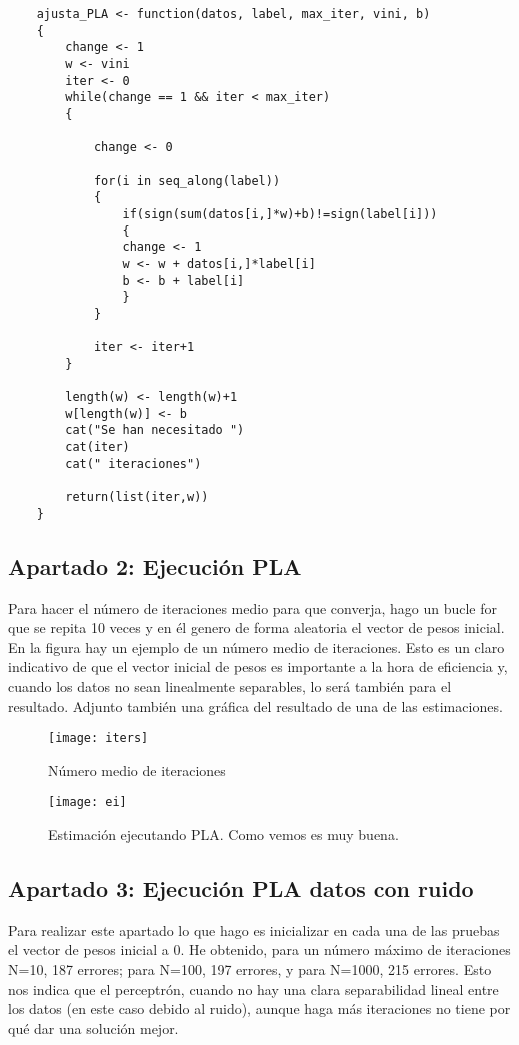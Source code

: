 	\begin{lstlisting}
	ajusta_PLA <- function(datos, label, max_iter, vini, b)
	{
		change <- 1
		w <- vini
		iter <- 0
		while(change == 1 && iter < max_iter)
		{  
		
			change <- 0
			
			for(i in seq_along(label))
			{
				if(sign(sum(datos[i,]*w)+b)!=sign(label[i]))
				{
				change <- 1
				w <- w + datos[i,]*label[i]
				b <- b + label[i]
				}
			}
			
			iter <- iter+1
		}
		
		length(w) <- length(w)+1
		w[length(w)] <- b
		cat("Se han necesitado ")
		cat(iter)
		cat(" iteraciones")
		
		return(list(iter,w))
	}
\end{lstlisting}


\subsection{Apartado 2: Ejecución PLA}
Para hacer el número de iteraciones medio para que converja, hago un bucle for que se repita 10 veces y en él genero de forma aleatoria el vector de pesos inicial. En la figura hay un ejemplo de un número medio de iteraciones. Esto es un claro indicativo de que el vector inicial de pesos es importante a la hora de eficiencia y, cuando los datos no sean linealmente separables, lo será también para el resultado. Adjunto también una gráfica del resultado de una de las estimaciones.
\begin{figure} [H]
\centering
\texttt{[image: iters]}
\caption{Número medio de iteraciones}
\label{fig:iters}
\end{figure}

\begin{figure} [H]
\centering
\texttt{[image: ei]}
\caption{Estimación ejecutando PLA. Como vemos es muy buena.}
\label{fig:ei}
\end{figure}


\subsection{Apartado 3: Ejecución PLA datos con ruido}
Para realizar este apartado lo que hago es inicializar en cada una de las pruebas el vector de pesos inicial a 0. He obtenido, para un número máximo de iteraciones N=10, 187 errores; para N=100, 197 errores, y para N=1000, 215 errores. Esto nos indica que el perceptrón, cuando no hay una clara separabilidad lineal entre los datos (en este caso debido al ruido), aunque haga más iteraciones no tiene por qué dar una solución mejor.

